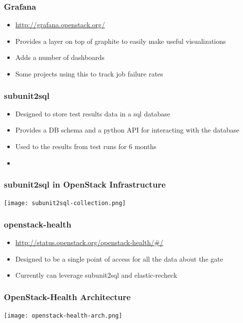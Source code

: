 \documentclass[aspectratio=169,11pt,hyperref={colorlinks=true}]{beamer}
\begin{document}
\begin{frame}
    \frametitle{Grafana}
    \begin{itemize}
        \item \href{http://grafana.openstack.org/}{http://grafana.openstack.org/}
        \item Provides a layer on top of graphite to easily make useful visualizations
        \item Adds a number of dashboards
        \item Some projects using this to track job failure rates
    \end{itemize}
\end{frame}

\begin{frame}
    \frametitle{subunit2sql}
    \begin{itemize}
        \item Designed to store test results data in a sql database
        \item Provides a DB schema and a python API for interacting with the
              database
        \item Used to the results from test runs for 6 months
        \item
    \end{itemize}
\end{frame}

\begin{frame}
    \frametitle{subunit2sql in OpenStack Infrastructure}
    \begin{center}
        \texttt{[image: subunit2sql-collection.png]}
    \end{center}
\end{frame}

\begin{frame}
    \frametitle{openstack-health}
    \begin{itemize}
        \item \href{http://status.openstack.org/openstack-health/\#/}{http://status.openstack.org/openstack-health/\#/}
        \item Designed to be a single point of access for all the data about the gate
        \item Currently can leverage subunit2sql and elastic-recheck
    \end{itemize}
\end{frame}

\begin{frame}
    \frametitle{OpenStack-Health Architecture}
    \begin{center}
        \texttt{[image: openstack-health-arch.png]}
    \end{center}
\end{frame}
\end{document}
